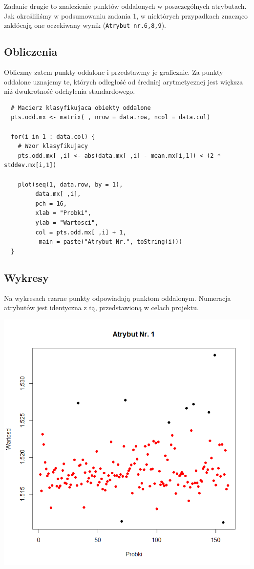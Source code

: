 \documentclass[a4paper,12pt,twoside]{article}
\begin{document}
Zadanie drugie to znalezienie punktów oddalonych w poszczególnych atrybutach. Jak określiliśmy w podsumowaniu
zadania 1, w niektórych przypadkach znacząco zakłócają one oczekiwany wynik (\texttt{Atrybut nr.6,8,9}).\\

\subsection{Obliczenia}

Obliczmy zatem punkty oddalone i przedstawmy je graficznie. Za punkty oddalone uznajemy te, których odległość
od średniej arytmetycznej jest większa niż dwukrotność odchylenia standardowego.

\medskip
\begin{lstlisting}
  # Macierz klasyfikujaca obiekty oddalone
  pts.odd.mx <- matrix( , nrow = data.row, ncol = data.col)

  for(i in 1 : data.col) {
    # Wzor klasyfikujacy
    pts.odd.mx[ ,i] <- abs(data.mx[ ,i] - mean.mx[i,1]) < (2 * stddev.mx[i,1])

    plot(seq(1, data.row, by = 1),
         data.mx[ ,i],
         pch = 16,
         xlab = "Probki",
         ylab = "Wartosci",
         col = pts.odd.mx[ ,i] + 1,
          main = paste("Atrybut Nr.", toString(i)))
  }
\end{lstlisting}

\subsection{Wykresy}

Na wykresach czarne punkty odpowiadają punktom oddalonym. Numeracja atrybutów jest identyczna z tą,
przedstawioną w celach projektu.\\

\begin{center}
\includegraphics[width=.90\textwidth]{img/2_pkt_oddalone_1.png}
\end{center}
\end{document}
